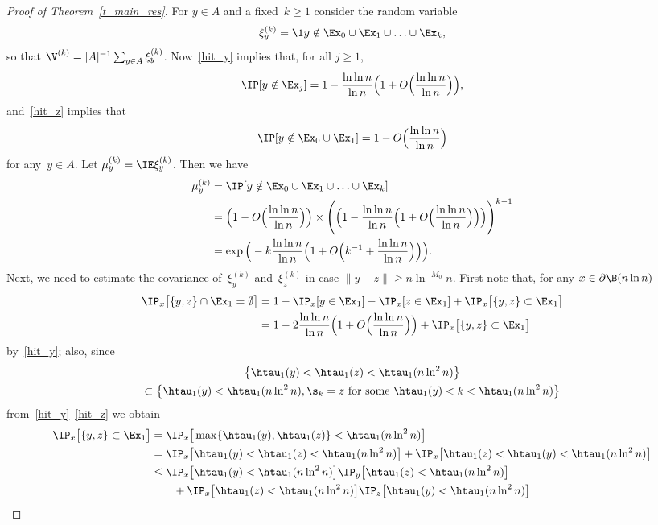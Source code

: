 \begin{proof}[Proof of Theorem~\ref{t_main_res}]
For $y\in A$ and a fixed~$k\geq 1$ consider the random variable
\[
\xi_y^{(k)} = \1{y\notin\Ex_0\cup \Ex_1\cup \ldots \cup \Ex_k},
\]
so that $\V^{(k)} = |A|^{-1}\sum_{y\in A}\xi_y^{(k)}$. Now~\eqref{hit_y} implies that, for all $j\geq 1$,
\[
\IP[y\notin \Ex_j] = 1-\frac{\ln\ln n}{\ln n}
\Big(1+O\Big(\frac{\ln\ln n}{\ln n}\Big)\Big),
\]
and~\eqref{hit_z} implies that
\[
\IP[y\notin \Ex_0\cup\Ex_1] = 1 - O\Big(\frac{\ln\ln n}{\ln n}\Big)
\]
for any~$y\in A$. Let $\mu_y^{(k)}=\IE \xi_y^{(k)}$. Then we have
\begin{align}
\mu_y^{(k)} &= \IP[y\notin\Ex_0\cup \Ex_1\cup \ldots \cup \Ex_k]
\nonumber\\
&= \Big(1-O\Big(\frac{\ln\ln n}{\ln n}\Big)\Big)
\times
\Bigg(\Big(1-\frac{\ln\ln n}{\ln n}
\Big(1+O\Big(\frac{\ln\ln n}{\ln n}\Big)\Big)\Big)
\Bigg)^{k-1}\nonumber\\
&= \exp\Big(-k\frac{\ln\ln n}{\ln n}
\Big(1+O\Big(k^{-1}+\frac{\ln\ln n}{\ln n}\Big)\Big)\Big).\label{est_mu_k}
\end{align}
Next, we need to estimate the covariance of~$\xi_y^{(k)}$ and~$\xi_z^{(k)}$ in case $\|y-z\|\geq n\ln^{-M_0}n$. First note that, for any $x\in \partial\B(n\ln n)$
\begin{align*}
\IP_x\big[\{y,z\}\cap \Ex_1 = \emptyset \big] &= 1-\IP_x[y\in\Ex_1] - \IP_x[z\in\Ex_1] + \IP_x\big[\{y,z\}\subset \Ex_1 \big]\\
&= 1- 2 \frac{\ln\ln n}{\ln n}
\Big(1+O\Big(\frac{\ln\ln n}{\ln n}\Big)\Big) + \IP_x\big[\{y,z\}\subset \Ex_1 \big]
\end{align*}
by~\eqref{hit_y}; also, since
\begin{multline*}
\big\{\htau_1(y)<\htau_1(z)<\htau_1(n\ln^2 n)\big\} \\
\subset
\big\{\htau_1(y)<\htau_1(n\ln^2 n),\s_k=z \text{ for some }
\htau_1(y)<k<\htau_1(n\ln^2 n)\big\}
\end{multline*}
from~\eqref{hit_y}--\eqref{hit_z} we obtain
\begin{align*}
\IP_x\big[\{y,z\}\subset \Ex_1 \big] &=
\IP_x\big[\max\{\htau_1(y),\htau_1(z)\}<\htau_1(n\ln^2 n)\big]
\\
&= \IP_x\big[\htau_1(y)<\htau_1(z)<\htau_1(n\ln^2 n)\big] + \IP_x\big[\htau_1(z)<\htau_1(y)<\htau_1(n\ln^2 n)\big]\\
&\leq \IP_x\big[\htau_1(y)<\htau_1(n\ln^2 n)\big]
\IP_y\big[\htau_1(z)<\htau_1(n\ln^2 n)\big]\\
& \qquad + \IP_x\big[\htau_1(z)<\htau_1(n\ln^2 n)\big]
\IP_z\big[\htau_1(y)<\htau_1(n\ln^2 n)\big]\\

\end{align*}
\end{proof}
